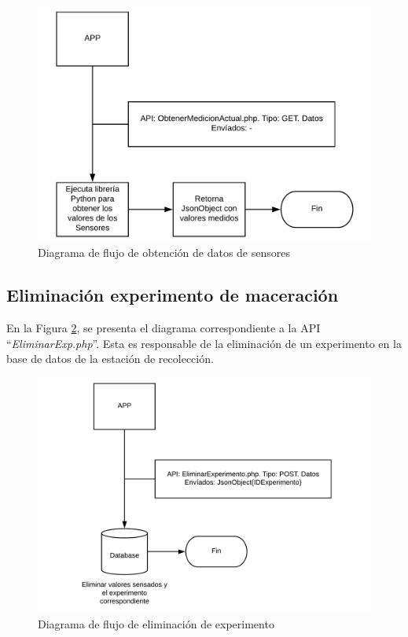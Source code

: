             \begin{figure}[h]
                \centering
                \includegraphics[scale=0.35]{DiagramaGetTempPh.pdf}
                \caption{Diagrama de flujo de obtención de datos de sensores}
                \label{fig:ApiGetTempPh}
            \end{figure}
        
        \subsection{Eliminación experimento de maceración}
        \par En la Figura \ref{fig:ApiRemoveExp}, se presenta el diagrama correspondiente a la API ``\textit{EliminarExp.php}''. Esta es responsable de la eliminación de un experimento en la base de datos de la estación de recolección.
            \begin{figure}[h]
                \centering
                \includegraphics[scale=0.5]{DiagramaRemoveExp.pdf}
                \caption{Diagrama de flujo de eliminación de experimento}
                \label{fig:ApiRemoveExp}
            \end{figure}
            
